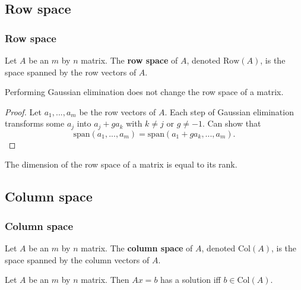 \documentclass[compress]{beamer}
\newcommand{\spn}{\mathrm{span}}
\newcommand{\row}{\mathrm{Row}}
\newcommand{\col}{\mathrm{Col}}
\begin{document}
\subsection{Row space}
\begin{frame}
  \frametitle{Row space}
  \begin{definition}
    Let $A$ be an $m$ by $n$ matrix. The \textbf{row space} of $A$,
    denoted $\row (A)$, is the space spanned by the row vectors of $A$.
  \end{definition}
  \begin{lemma}
    Performing Gaussian elimination does not change the row space of a
    matrix. 
  \end{lemma}
  \begin{proof}
    Let $a_{1},...,a_m$ be the row vectors of $A$. Each step of Gaussian
    elimination transforms some $a_j$ into $a_j + g a_k$ with $k \neq j$
    or $g \neq -1$. Can show that
    \[ \spn(a_1,...,a_m) = \spn(a_1 + g a_k , ..., a_m). \]
  \end{proof}
  \begin{corollary}\label{cor:rankdimrow}
    The dimension of the row space of a matrix is equal to its rank.
  \end{corollary}
\end{frame}

\subsection{Column space}

\begin{frame}
  \frametitle{Column space}
  \begin{definition}
    Let $A$ be an $m$ by $n$ matrix. The \textbf{column space} of $A$,
    denoted $\col(A)$, is the space spanned by the column vectors of
    $A$.
  \end{definition}
  \begin{lemma}
    Let $A$ be an $m$ by $n$ matrix. Then $A x = b$ has a solution iff $b
    \in \col(A)$.
  \end{lemma}
\end{frame}
\end{document}
